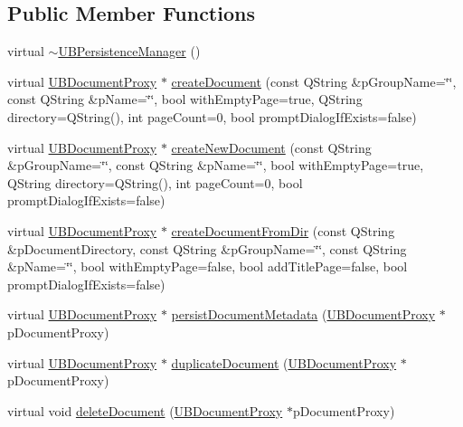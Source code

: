 \subsection*{Public Member Functions}
\begin{DoxyCompactItemize}
\item 
virtual \hyperlink{class_u_b_persistence_manager_a2bb60bc321b56117430ab8aeb351d6bb}{$\sim$\-U\-B\-Persistence\-Manager} ()
\item 
virtual \hyperlink{class_u_b_document_proxy}{U\-B\-Document\-Proxy} $\ast$ \hyperlink{class_u_b_persistence_manager_a47e4dc44bdbeab6ac217d51419000ca3}{create\-Document} (const Q\-String \&p\-Group\-Name=\char`\"{}\char`\"{}, const Q\-String \&p\-Name=\char`\"{}\char`\"{}, bool with\-Empty\-Page=true, Q\-String directory=Q\-String(), int page\-Count=0, bool prompt\-Dialog\-If\-Exists=false)
\item 
virtual \hyperlink{class_u_b_document_proxy}{U\-B\-Document\-Proxy} $\ast$ \hyperlink{class_u_b_persistence_manager_a0bd236690f1efa4fe856489914a3d92b}{create\-New\-Document} (const Q\-String \&p\-Group\-Name=\char`\"{}\char`\"{}, const Q\-String \&p\-Name=\char`\"{}\char`\"{}, bool with\-Empty\-Page=true, Q\-String directory=Q\-String(), int page\-Count=0, bool prompt\-Dialog\-If\-Exists=false)
\item 
virtual \hyperlink{class_u_b_document_proxy}{U\-B\-Document\-Proxy} $\ast$ \hyperlink{class_u_b_persistence_manager_ac815cff8d53be5e6bb870aa4e83319f7}{create\-Document\-From\-Dir} (const Q\-String \&p\-Document\-Directory, const Q\-String \&p\-Group\-Name=\char`\"{}\char`\"{}, const Q\-String \&p\-Name=\char`\"{}\char`\"{}, bool with\-Empty\-Page=false, bool add\-Title\-Page=false, bool prompt\-Dialog\-If\-Exists=false)
\item 
virtual \hyperlink{class_u_b_document_proxy}{U\-B\-Document\-Proxy} $\ast$ \hyperlink{class_u_b_persistence_manager_ab96bfcd20014ff5bb36fede047aef3b2}{persist\-Document\-Metadata} (\hyperlink{class_u_b_document_proxy}{U\-B\-Document\-Proxy} $\ast$p\-Document\-Proxy)
\item 
virtual \hyperlink{class_u_b_document_proxy}{U\-B\-Document\-Proxy} $\ast$ \hyperlink{class_u_b_persistence_manager_ac38f7641c3942edd498b39babf860eba}{duplicate\-Document} (\hyperlink{class_u_b_document_proxy}{U\-B\-Document\-Proxy} $\ast$p\-Document\-Proxy)
\item 
virtual void \hyperlink{class_u_b_persistence_manager_ad01510f9b27ebe96e650178a68ea2d0e}{delete\-Document} (\hyperlink{class_u_b_document_proxy}{U\-B\-Document\-Proxy} $\ast$p\-Document\-Proxy)

\end{DoxyCompactItemize}
